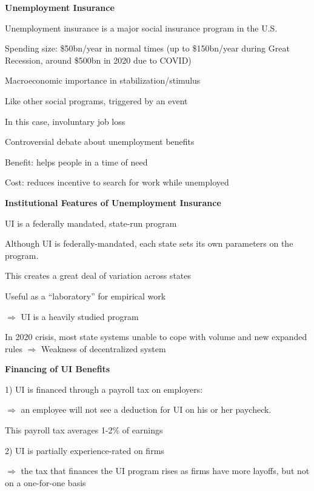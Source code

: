 \documentclass[landscape]{slides}
\begin{document}
\begin{slide}
\begin{center}
{\bf Unemployment Insurance}
\end{center}

Unemployment insurance is a major social insurance program in the U.S.

Spending size: \$50bn/year in normal times (up to \$150bn/year during Great Recession,
around \$500bn in 2020 due to COVID)

Macroeconomic importance in stabilization/stimulus

Like other social programs, triggered by an event

In this case, involuntary job loss

Controversial debate about unemployment benefits

Benefit: helps people in a time of need

Cost: reduces incentive to search for work while unemployed


\end{slide}

\begin{slide}

\end{slide}


\begin{slide}
\begin{center}
{\bf Institutional Features of Unemployment Insurance}
\end{center}

UI is a federally mandated, state-run program

Although UI is federally-mandated, each state sets its own parameters on the program.

This creates a great deal of variation across states

Useful as a ``laboratory'' for empirical work

$\Rightarrow$ UI is a heavily studied program

In 2020 crisis, most state systems unable to cope with volume and new expanded rules  $\Rightarrow$ Weakness of 
decentralized system
\end{slide}

\begin{slide}
\begin{center}
{\bf Financing of UI Benefits}
\end{center}

1) UI is financed through a payroll tax on employers:

$\Rightarrow$ an employee will not see a deduction for UI on his or her paycheck.

This payroll tax averages 1-2\% of earnings

2) UI is partially experience-rated on firms

$\Rightarrow$ the tax that finances the UI program rises as firms have more layoffs, but not on a one-for-one basis
\end{slide}
\end{document}

